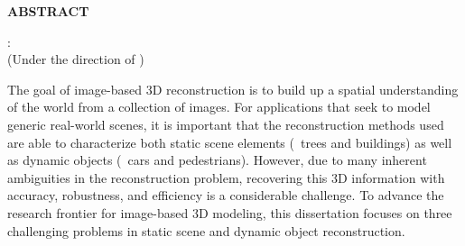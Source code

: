 
\begin{center}
\vspace*{46pt}
\textbf{ABSTRACT}
\vspace{4pt}

\begin{singlespace}
\thesisauthor: \thesistitle \\
(Under the direction of \thesisadvisors)
\vspace{10pt}
\end{singlespace}
\end{center}





The goal of image-based 3D reconstruction is to build up a spatial understanding of the world from a collection of images. For applications that seek to model generic real-world scenes, it is important that the reconstruction methods used are able to characterize both static scene elements (\eg~trees and buildings) as well as dynamic objects (\eg~cars and pedestrians). However, due to many inherent ambiguities in the reconstruction problem, recovering this 3D information with accuracy, robustness, and efficiency is a considerable challenge. To advance the research frontier for image-based 3D modeling, this dissertation focuses on three challenging problems in static scene and dynamic object reconstruction. 

